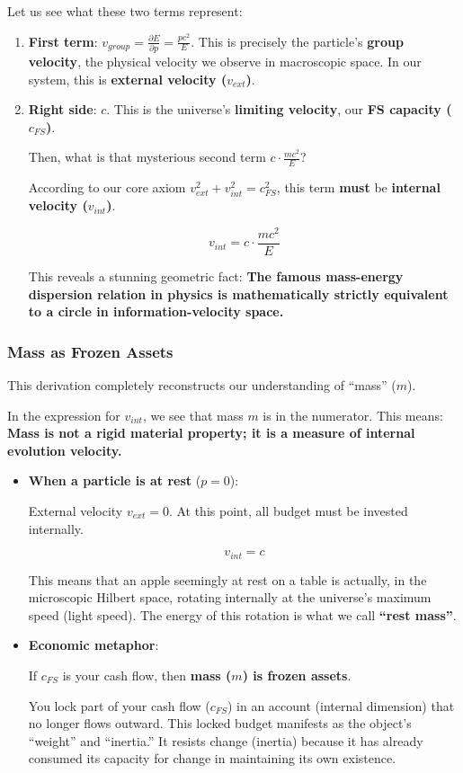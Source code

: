 Let us see what these two terms represent:

\begin{enumerate}
\item \textbf{First term}: $v_{group} = \frac{\partial E}{\partial p} = \frac{pc^2}{E}$. This is precisely the particle's \textbf{group velocity}, the physical velocity we observe in macroscopic space. In our system, this is \textbf{external velocity ($v_{ext}$)}.

\item \textbf{Right side}: $c$. This is the universe's \textbf{limiting velocity}, our \textbf{FS capacity ($c_{FS}$)}.

Then, what is that mysterious second term $c \cdot \frac{mc^2}{E}$?

According to our core axiom $v_{ext}^2 + v_{int}^2 = c_{FS}^2$, this term \textbf{must} be \textbf{internal velocity ($v_{int}$)}.

\[v_{int} = c \cdot \frac{mc^2}{E}\]

This reveals a stunning geometric fact: \textbf{The famous mass-energy dispersion relation in physics is mathematically strictly equivalent to a circle in information-velocity space.}
\end{enumerate}

\subsubsection{Mass as Frozen Assets}

This derivation completely reconstructs our understanding of ``mass'' ($m$).

In the expression for $v_{int}$, we see that mass $m$ is in the numerator. This means: \textbf{Mass is not a rigid material property; it is a measure of internal evolution velocity.}

\begin{itemize}
\item \textbf{When a particle is at rest} ($p=0$):

    External velocity $v_{ext} = 0$. At this point, all budget must be invested internally.

    \[v_{int} = c\]

    This means that an apple seemingly at rest on a table is actually, in the microscopic Hilbert space, rotating internally at the universe's maximum speed (light speed). The energy of this rotation is what we call \textbf{``rest mass''}.

\item \textbf{Economic metaphor}:

    If $c_{FS}$ is your cash flow, then \textbf{mass ($m$) is frozen assets}.

    You lock part of your cash flow ($c_{FS}$) in an account (internal dimension) that no longer flows outward. This locked budget manifests as the object's ``weight'' and ``inertia.'' It resists change (inertia) because it has already consumed its capacity for change in maintaining its own existence.
\end{itemize}

